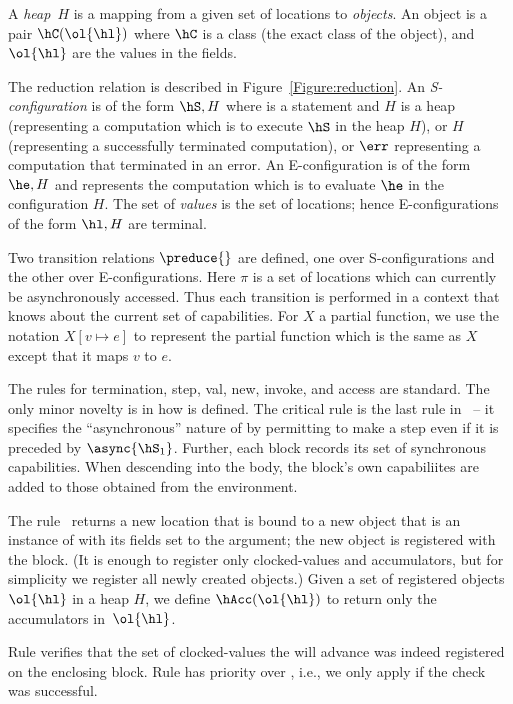 A {\em heap}~$H$ is a mapping from a given set of locations to {\em
  objects}. An object is a pair $\hC(\ol{\hl})$ where $\hC$ is a class (the exact
class of the object), and $\ol{\hl}$ are the values in the fields.

The reduction relation is described in
Figure~\ref{Figure:reduction}. An {\em S-configuration} is of the form
$\hS,H$ where \hS{} is a statement and $H$ is a heap (representing a
computation which is to execute $\hS$ in the heap $H$), or $H$
(representing a successfully terminated computation), or $\err$
representing a computation that terminated in an error. An
E-configuration is of the form $\he,H$ and represents the
computation which is to evaluate $\he$ in the configuration $H$. The
set of {\em values} is the set of locations; hence E-configurations of
the form $\hl,H$ are terminal.

Two transition relations $\preduce{}$ are defined, one over
S-configurations and the other over E-configurations. Here $\pi$ is a
set of locations which can currently be asynchronously accessed.  Thus
each transition is performed in a context that knows about the current
set of capabilities.  For $X$ a partial function, we use the notation
$X[v \mapsto e]$ to represent the partial function which is the same
as $X$ except that it maps $v$ to $e$.

The rules for termination, step, val, new, invoke, and access
are standard.  The only minor novelty is in how \hasync{} is
defined. The critical rule is the last rule in~ -- it
specifies the ``asynchronous'' nature of \hasync{} by permitting \hS{}
to make a step even if it is preceded by $\async{\hS_1}$. Further,
each block records its set of synchronous capabilities. When
descending into the body, the block's own capabiliites are added to
those obtained from the environment.

%
The rule~ returns a new location that is bound to a new
object that is an instance of \hC{} with its fields set to the argument;
    the new object is registered with the block.
(It is enough to register only clocked-values and accumulators, but
    for simplicity we register all newly created objects.)
Given a set of registered objects $\ol{\hl}$ in a heap $H$,
    we define
    $\hAcc(\ol{\hl})$ to return only the accumulators in~$\ol{\hl}$.


Rule  verifies that the set of clocked-values the \hfinish
    will advance was indeed registered on the enclosing block.
Rule  has priority over ,
    i.e., we only apply  if the check was successful.

